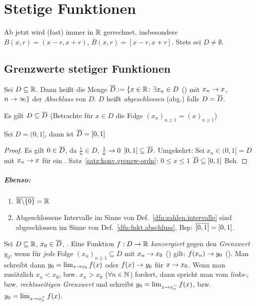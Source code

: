 \documentclass[12pt]{scrreprt}
\begin{document}
\chapter{Stetige Funktionen}
\label{cha:fnkt}
Ab jetzt wird (fast) immer in $\mathbb{R}$ gerrechnet, insbesondere $B(x, r) = (x-r, x+r)$, $\overline{B}(x, r) = [x-r, x+r]$.
Stets sei $D \neq \emptyset$.

\section{Grenzwerte stetiger Funktionen}
\label{sec:fnkt.grenzw-stetigk}
\begin{dfn}\label{dfn:fnkt.abschluss}
Sei $D \subseteq \mathbb{R}$. Dann heißt die Menge $\overline{D} := \{x\in\mathbb{R}\colon \exists x_n\in D$ ()
mit $ x_n \rightarrow x$, $n\rightarrow\infty\}$ der \emph{Abschluss} von $D$. $D$ heißt \emph{abgeschlossen} (abg.) falls $D = \overline{D}$.
\end{dfn}

\begin{bem*}
Es gilt $D \subseteq \overline{D}$ (Betrachte für $x\in D$ die Folge $(x_n)_{n\ge 1} = (x)_{n\ge 1}$)
\end{bem*}

\begin{bsp*}
Sei $D = (0, 1]$, dann ist $\overline{D} = [0, 1]$
\end{bsp*}
\begin{proof}
Es gilt $0\in\overline{D}$, da $\frac{1}{n}\in D$, $\frac{1}{n} \rightarrow 0$  \folgt $[0, 1] \subseteq \overline{D}$. 
Umgekehrt: Sei $x_n \in (0, 1] = D$ mit $x_n \rightarrow x$ für ein . Satz~\ref{satz:konv.grenzw-ordn}: $0\le x\le 1$ \folgt $\overline{D} \subseteq [0,1]$ \folgt Beh.
\end{proof}

\paragraph{Ebenso:}
\begin{enumerate}
\item $\overline{\mathbb{R}\backslash\{0\}} = \mathbb{R}$
\item Abgeschlossene Intervalle im Sinne von Def.~\ref{dfn:zahlen.intervalle} sind abgeschlossen im Sinne 
von Def.~\ref{dfn:fnkt.abschluss}, Bsp: $\overline{[0, 1]} = [0, 1]$.
\end{enumerate}

\begin{dfn}\label{dfn:fnkt.grenzw-fnkt}
Sei $D \subseteq \mathbb{R}$, $x_0 \in \overline{D}$, . Eine Funktion $f: D \rightarrow \mathbb{R}$ \emph{konvergiert}
gegen den \emph{Grenzwert} $y_0$, wenn für \emph{jede} Folge $(x_n)_{n \ge 1} \subseteq D$ mit $x_n \rightarrow x_0$ (\ninf) gilt:
$f(x_n) \rightarrow y_0$ (\ninf). Man schreibt dann $y_0 = \lim_{x\rightarrow x_0} f(x)$ oder $f(x) \rightarrow y_0$ für $x \rightarrow x_0$.
Wenn man zusätzlich $x_n < x_0$, bzw. $x_n > x_0$ ($\forall n\in\mathbb{N}$) fordert, dann spricht man vom \emph{links-}, 
bzw. \emph{rechtsseitigen Grenzwert} und schreibt $y_0 = \lim_{x\rightarrow x_0^-} f(x)$, bzw. $y_0 = \lim_{x\rightarrow x_0^+} f(x)$.
\end{dfn}
\end{document}

